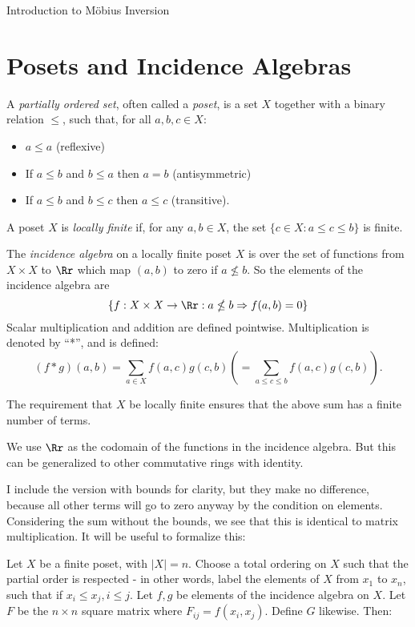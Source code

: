 \documentclass[12pt]{pom_thesis}
\begin{document}
\begin{chapter}{Introduction to M\"obius Inversion}
\section{Posets and Incidence Algebras}
\begin{defn}
A \emph{partially ordered set}, often called a \emph{poset}, is a set $X$ together with a binary relation $\leq$, such that, for all $a,b,c \in X$:
\begin{itemize}
\item $a \leq a$ (reflexive)
\item If $a \leq b$ and $b \leq a$ then $a = b$ (antisymmetric)
\item If $a \leq b$ and $b \leq c$ then $a \leq c$ (transitive).
\end{itemize}
\end{defn}
\begin{defn}
A poset $X$ is \emph{locally finite} if, for any $a,b \in X$, the set $\{c \in X : a \leq c \leq b\}$ is finite.
\end{defn}
\begin{defn}
The \emph{incidence algebra} on a locally finite poset $X$ is over the set of functions from $X \times X$ to $\Rr$ which map $(a,b)$ to zero if $a \nleq b$. So the elements of the incidence algebra are 
\[\{f:X \times X \rightarrow \Rr:a \nleq b \Rightarrow f(a,b) = 0\}
\]
Scalar multiplication and addition are defined pointwise.  Multiplication is denoted by ``*'', and is defined:
\[(f* g)(a,b) = \sum_{a \in X}f(a,c)g(c,b) \left( = \sum_{a \leq c \leq b}f(a,c)g(c,b)\right).\]
\end{defn}
\begin{rmk}
The requirement that $X$ be locally finite ensures that the above sum has a finite number of terms.
\end{rmk}
\begin{rmk}
We use $\Rr$ as the codomain of the functions in the incidence algebra. But this can be generalized to other commutative rings with identity.
\end{rmk}
I include the version with bounds for clarity, but they make no difference, because all other terms will go to zero anyway by the condition on elements. Considering the sum without the bounds, we see that this is identical to matrix multiplication. It will be useful to formalize this:
\begin{lemma}\label{mat_eq}
Let $X$ be a finite poset, with $|X|=n$. Choose a total ordering on $X$ such that the partial order is respected - in other words, label the elements of $X$ from $x_1$ to $x_n$, such that if $x_i \leq x_j, i \leq j$. Let $f,g$ be elements of the incidence algebra on $X$. Let $F$ be the $n\times n$ square matrix where $F_{ij}=f(x_i, x_j)$. Define $G$ likewise. Then:

\end{lemma}
\end{chapter}
\end{document}
